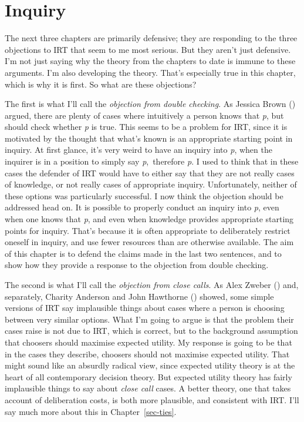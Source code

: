 \documentclass[
  10pt,
  letterpaper,
  twoside]{scrbook}
\begin{document}

\chapter{Inquiry}\label{sec-inquiry}

The next three chapters are primarily defensive; they are responding to
the three objections to IRT that seem to me most serious. But they
aren't just defensive. I'm not just saying why the theory from the
chapters to date is immune to these arguments. I'm also developing the
theory. That's especially true in this chapter, which is why it is
first. So what are these objections?

The first is what I'll call the \emph{objection from double checking}.
As Jessica Brown () argued, there are
plenty of cases where intuitively a person knows that \emph{p}, but
should check whether \emph{p} is true. This seems to be a problem for
IRT, since it is motivated by the thought that what's known is an
appropriate starting point in inquiry. At first glance, it's very weird
to have an inquiry into \emph{p}, when the inquirer is in a position to
simply say \emph{p},~therefore \emph{p}. I used to think that in these
cases the defender of IRT would have to either say that they are not
really cases of knowledge, or not really cases of appropriate inquiry.
Unfortunately, neither of these options was particularly successful. I
now think the objection should be addressed head on. It is possible to
properly conduct an inquiry into \emph{p}, even when one knows that
\emph{p}, and even when knowledge provides appropriate starting points
for inquiry. That's because it is often appropriate to deliberately
restrict oneself in inquiry, and use fewer resources than are otherwise
available. The aim of this chapter is to defend the claims made in the
last two sentences, and to show how they provide a response to the
objection from double checking.

The second is what I'll call the \emph{objection from close calls}. As
Alex Zweber () and, separately, Charity
Anderson and John Hawthorne
() showed, some simple
versions of IRT say implausible things about cases where a person is
choosing between very similar options. What I'm going to argue is that
the problem their cases raise is not due to IRT, which is correct, but
to the background assumption that choosers should maximise expected
utility. My response is going to be that in the cases they describe,
choosers should not maximise expected utility. That might sound like an
absurdly radical view, since expected utility theory is at the heart of
all contemporary decision theory. But expected utility theory has fairly
implausible things to say about \emph{close call} cases. A better
theory, one that takes account of deliberation costs, is both more
plausible, and consistent with IRT. I'll say much more about this in
Chapter~\ref{sec-ties}.
\end{document}
